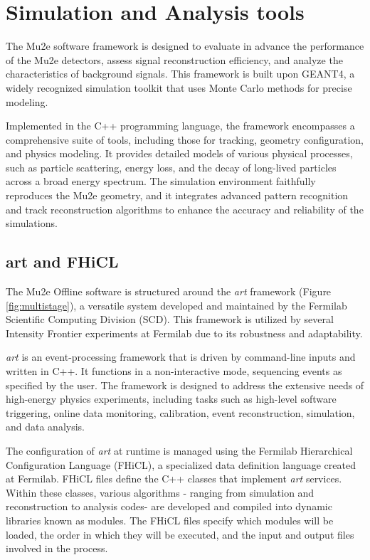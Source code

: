 
\chapter{Simulation and Analysis tools}\label{mu2eana}

The Mu2e software framework is designed to 
evaluate in advance the performance of the 
Mu2e detectors, assess signal reconstruction 
efficiency, and analyze the characteristics of 
background signals. This framework is built upon 
GEANT4, a widely recognized simulation toolkit 
that uses Monte Carlo methods for precise modeling.

Implemented in the C++ programming language, 
the framework encompasses a comprehensive suite of 
tools, including those for tracking, geometry 
configuration, and physics modeling. It provides 
detailed models of various physical processes, 
such as particle scattering, energy loss, and the 
decay of long-lived particles across a broad energy 
spectrum. The simulation environment faithfully 
reproduces the Mu2e geometry, and it integrates 
advanced pattern recognition and track reconstruction 
algorithms to enhance the accuracy and reliability of 
the simulations.

\section{art and FHiCL}

The Mu2e Offline software is structured around the \textit{art} framework 
(Figure \ref{fig:multistage}), a versatile system developed and maintained 
by the Fermilab Scientific Computing Division (SCD). This framework is 
utilized by several Intensity Frontier experiments at Fermilab due to its robustness and adaptability.

\textit{art} is an event-processing framework that is driven by command-line 
inputs and written in C++. It functions in a non-interactive mode, sequencing 
events as specified by the user. The framework is designed to address the 
extensive needs of high-energy physics experiments, including tasks such as 
high-level software triggering, online data monitoring, calibration, event 
reconstruction, simulation, and data analysis.

The configuration of \textit{art} at runtime is managed using the Fermilab 
Hierarchical Configuration Language (FHiCL), a specialized data definition 
language created at Fermilab. FHiCL files define the C++ classes that 
implement \textit{art} services. Within these classes, various algorithms -
ranging from simulation and reconstruction to analysis codes- are developed 
and compiled into dynamic libraries known as modules. The FHiCL files specify 
which modules will be loaded, the order in which they will be executed, and 
the input and output files involved in the process.

